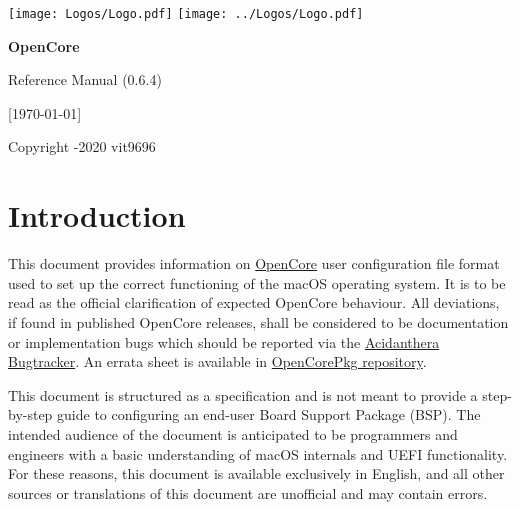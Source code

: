 \documentclass[]{article}
\begin{document}
\begin{titlepage}
   \begin{center}
       \vspace*{2.0in}

       \Huge

         {\texttt{[image: Logos/Logo.pdf]}}
         {\texttt{[image: ../Logos/Logo.pdf]}}

       \sffamily

       \textbf{OpenCore}

       \vspace{0.2in}

       Reference Manual (0.6.4)

       \vspace{0.2in}

        {[}\today{]}

       \normalsize

       \vfill

       \rmfamily

       Copyright -2020 vit9696

   \end{center}
\end{titlepage}

\tableofcontents

\section{Introduction}\label{introduction}

This document provides information on
\href{https://github.com/acidanthera/OpenCorePkg}{OpenCore} user
configuration file format used to set up the correct functioning of the macOS
operating system. It is to be read as the official clarification of expected
OpenCore behaviour. All deviations, if found in published OpenCore releases,
shall be considered to be documentation or implementation bugs which should be
reported via the \href{https://github.com/acidanthera/bugtracker}{Acidanthera Bugtracker}.
An errata sheet is available in
\href{https://github.com/acidanthera/OpenCorePkg/blob/master/Docs/Errata/Errata.pdf}{OpenCorePkg repository}.

This document is structured as a specification and is not meant to provide a step-by-step
guide to configuring an end-user Board Support Package (BSP). The intended audience
of the document is anticipated to be programmers and engineers with a basic understanding of macOS internals
and UEFI functionality. For these reasons, this document is available exclusively in English,
and all other sources or translations of this document are unofficial and may
contain errors.
\end{document}

